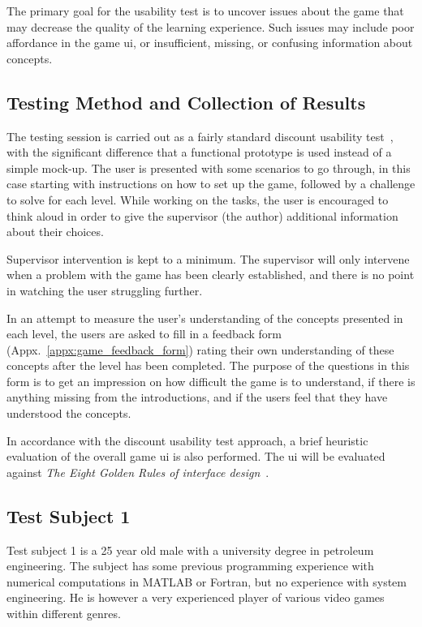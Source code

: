 \noindent
The primary goal for the usability test is to uncover issues about the game that may decrease the quality of the learning experience. Such issues may include poor affordance in the game \gls{ui}, or insufficient, missing, or confusing information about concepts.

\subsection{Testing Method and Collection of Results}
\label{sec:game_testing_method}
The testing session is carried out as a fairly standard discount usability test~\cite{nielsen:discount_usability}, with the significant difference that a functional prototype is used instead of a simple mock-up. The user is presented with some scenarios to go through, in this case starting with instructions on how to set up the game, followed by a challenge to solve for each level. While working on the tasks, the user is encouraged to think aloud in order to give the supervisor (the author) additional information about their choices.

\noindent
Supervisor intervention is kept to a minimum. The supervisor will only intervene when a problem with the game has been clearly established, and there is no point in watching the user struggling further.

\noindent
In an attempt to measure the user's understanding of the concepts presented in each level, the users are asked to fill in a feedback form (Appx.~\ref{appx:game_feedback_form}) rating their own understanding of these concepts after the level has been completed. The purpose of the questions in this form is to get an impression on how difficult the game is to understand, if there is anything missing from the introductions, and if the users feel that they have understood the concepts.

\noindent
In accordance with the discount usability test approach, a brief heuristic evaluation of the overall game \gls{ui} is also performed. The \gls{ui} will be evaluated against \emph{The Eight Golden Rules of interface design}~\cite{shneiderman:user_interface}.

\subsection{Test Subject 1}
\label{sec:game_testing_subject1}
Test subject 1 is a 25 year old male with a university degree in petroleum engineering. The subject has some previous programming experience with numerical computations in MATLAB or Fortran, but no experience with system engineering. He is however a very experienced player of various video games within different genres.

